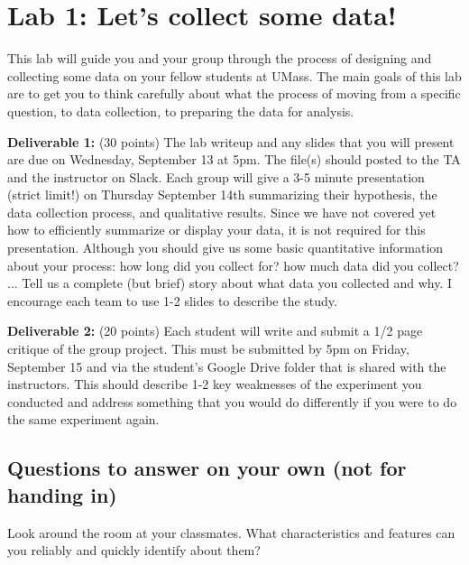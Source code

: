 \documentclass{article}\usepackage[]{graphicx}\usepackage[]{color}
\begin{document}

\section*{Lab 1: Let's collect some data!}

This lab will guide you and your group through the process of designing and collecting some data on your fellow students at UMass. The main goals of this lab are to get you to think carefully about what the process of moving from a specific question, to data collection, to preparing the data for analysis.

{\bf Deliverable 1:}
(30 points) The lab writeup and any slides that you will present are due on Wednesday, September 13 at 5pm. The file(s) should posted to the TA and the instructor on Slack. Each group will give a 3-5 minute presentation (strict limit!) on Thursday September 14th summarizing their hypothesis, the data collection process, and qualitative results. Since we have not covered yet how to efficiently summarize or display your data, it is not required for this presentation. Although you should give us some basic quantitative information about your process: how long did you collect for? how much data did you collect? ... Tell us a complete (but brief) story about what data you collected and why. I encourage each team to use 1-2 slides to describe the study.

{\bf Deliverable 2:} 
(20 points) Each student will write and submit a 1/2 page critique of the group project. This must be submitted by 5pm on Friday, September 15 and via the student's Google Drive folder that is shared with the instructors. This should describe 1-2 key weaknesses of the experiment you conducted and address something that you would do differently if you were to do the same experiment again.

\subsection*{Questions to answer on your own (not for handing in)}

\begin{exercise}
Look around the room at your classmates. What characteristics and features can you reliably and quickly identify about them? 
\end{exercise}
\end{document}
